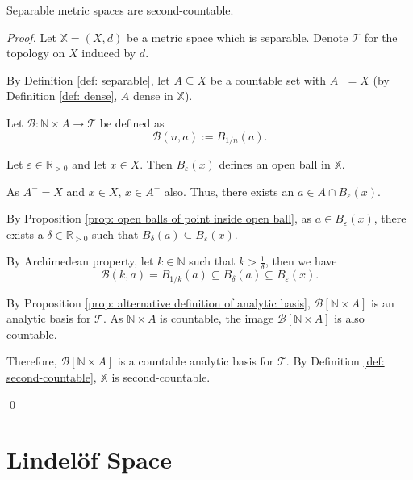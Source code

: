 \begin{proposition}
	Separable metric spaces are second-countable.
	
	\begin{proof}
		Let $\mathbb X = (X, d)$ be a metric space which is separable. Denote $\mathcal T$ for the topology on $X$ induced by $d$.
		
		By Definition \ref{def: separable}, let $A \subseteq X$ be a countable set with $A^- = X$ (by Definition \ref{def: dense}, $A$ dense in $\mathbb X$).
		
		Let $\mathcal B: \mathbb N \times A \to \mathcal T$ be defined as
		$$
		\mathcal B(n, a) := B_{1/n}(a).
		$$
		
		Let $\varepsilon \in \mathbb R_{> 0}$ and let $x \in X$. Then $B_\varepsilon(x)$ defines an open ball in $\mathbb X$.
		
		As $A^- = X$ and $x \in X$, $x \in A^-$ also. Thus, there exists an $a \in A \cap B_\varepsilon (x)$.
		
		By Proposition \ref{prop: open balls of point inside open ball}, as $a \in B_\varepsilon(x)$, there exists a $\delta \in \mathbb R_{> 0}$ such that $B_\delta(a) \subseteq B_\varepsilon (x)$.
		
		By Archimedean property, let $k \in \mathbb N$ such that $k > \frac{1}{\delta}$, then we have
		$$
		\mathcal B(k, a) = B_{1/k}(a) \subseteq B_\delta (a) \subseteq B_\varepsilon (x).
		$$
		
		By Proposition \ref{prop: alternative definition of analytic basis}, $\mathcal B[\mathbb N \times A]$ is an analytic basis for $\mathcal T$. As $\mathbb N \times A$ is countable, the image $\mathcal B[\mathbb N \times A]$ is also countable.
		
		Therefore, $\mathcal B[\mathbb N \times A]$ is a countable analytic basis for $\mathcal T$. By Definition \ref{def: second-countable}, $\mathbb X$ is second-countable.
		
		\qed
	\end{proof}
\end{proposition}


\section{Lindel\"of Space}



































%